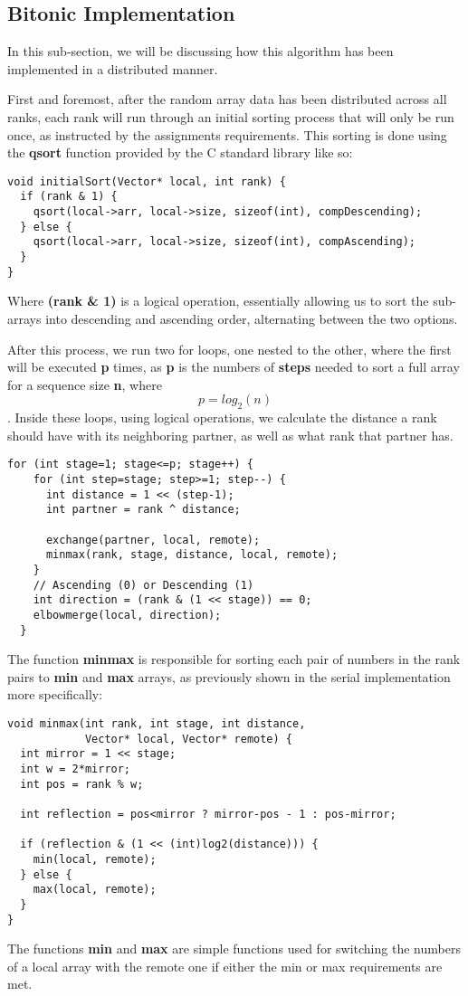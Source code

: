 \documentclass[12pt]{report}
\begin{document}
        \subsection{Bitonic Implementation}
        In this sub-section, we will be discussing how this algorithm has been implemented in a distributed manner.

        First and foremost, after the random array data has been distributed across all ranks, each rank will run through an initial sorting process that will only be run once, as instructed by the assignments requirements. This sorting is done using the \textbf{qsort} function provided by the C standard library like so:
        \begin{lstlisting}[style=cstyle]
void initialSort(Vector* local, int rank) {
  if (rank & 1) {
    qsort(local->arr, local->size, sizeof(int), compDescending);
  } else { 
    qsort(local->arr, local->size, sizeof(int), compAscending);
  }
}
        \end{lstlisting}
        Where \textbf{(rank \& 1)} is a logical operation, essentially allowing us to sort the sub-arrays into descending and ascending order, alternating between the two options.

        After this process, we run two for loops, one nested to the other, where the first will be executed \textbf{p} times, as \textbf{p} is the numbers of \textbf{steps} needed to sort a full array for a sequence size \textbf{n}, where \[p = log_2(n)\].
        Inside these loops, using logical operations, we calculate the distance a rank should have with its neighboring partner, as well as what rank that partner has.
        \newpage
        \begin{lstlisting}[style=cstyle]
for (int stage=1; stage<=p; stage++) {
    for (int step=stage; step>=1; step--) {
      int distance = 1 << (step-1);
      int partner = rank ^ distance;

      exchange(partner, local, remote);
      minmax(rank, stage, distance, local, remote);
    }
    // Ascending (0) or Descending (1)
    int direction = (rank & (1 << stage)) == 0;     
    elbowmerge(local, direction);
  }
        \end{lstlisting}
        The function \textbf{minmax} is responsible for sorting each pair of numbers in the rank pairs to \textbf{min} and \textbf{max} arrays, as previously shown in the serial implementation more specifically:
        \begin{lstlisting}[style=cstyle]
void minmax(int rank, int stage, int distance, 
            Vector* local, Vector* remote) {
  int mirror = 1 << stage;
  int w = 2*mirror;
  int pos = rank % w;

  int reflection = pos<mirror ? mirror-pos - 1 : pos-mirror; 

  if (reflection & (1 << (int)log2(distance))) {
    min(local, remote);
  } else {
    max(local, remote);
  }
}
        \end{lstlisting}
        The functions \textbf{min} and \textbf{max} are simple functions used for switching the numbers of a local
        \vspace{0.5cm}
        array with the remote one if either the min or max requirements are met.
        
\end{document}

